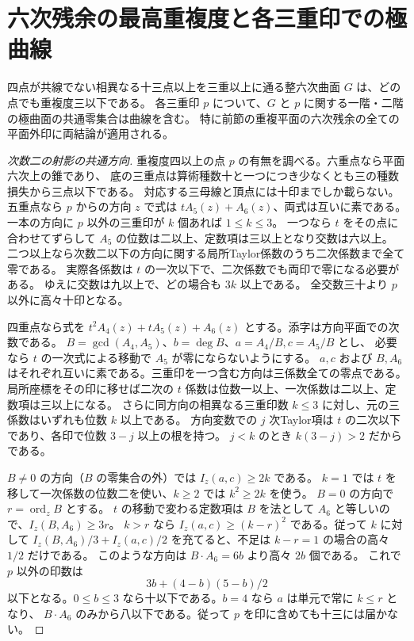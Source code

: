 \section{六次残余の最高重複度と各三重印での極曲線}
\label{sec:sextic-residual-triple-polars}
\begin{theorem}\label{thm:sextic-residual-triple-polars}
四点が共線でない相異なる十三点以上を三重以上に通る整六次曲面 $G$ は、どの点でも重複度三以下である。
各三重印 $p$ について、$G$ と $p$ に関する一階・二階の極曲面の共通零集合は曲線を含む。
特に前節の重複平面の六次残余の全ての平面外印に両結論が適用される。
\end{theorem}
\begin{proof}[次数二の射影の共通方向]
重複度四以上の点 $p$ の有無を調べる。六重点なら平面六次上の錐であり、
底の三重点は算術種数十と一つにつき少なくとも三の種数損失から三点以下である。
対応する三母線と頂点には十印までしか載らない。
五重点なら $p$ からの方向 $z$ で式は $tA_5(z)+A_6(z)$、両式は互いに素である。
一本の方向に $p$ 以外の三重印が $k$ 個あれば $1\le k\le3$。
一つなら $t$ をその点に合わせてずらして $A_5$ の位数は二以上、定数項は三以上となり交数は六以上。
二つ以上なら次数二以下の方向に関する局所Taylor係数のうち二次係数まで全て零である。
実際各係数は $t$ の一次以下で、二次係数でも両印で零になる必要がある。
ゆえに交数は九以上で、どの場合も $3k$ 以上である。
全交数三十より $p$ 以外に高々十印となる。

四重点なら式を $t^2 A_4(z)+t A_5(z)+A_6(z)$ とする。添字は方向平面での次数である。
$B=\gcd(A_4,A_5)$、$b=\deg B$、$a=A_4/B,c=A_5/B$ とし、
必要なら $t$ の一次式による移動で $A_5$ が零にならないようにする。
$a,c$ および $B,A_6$ はそれぞれ互いに素である。三重印を一つ含む方向は三係数全ての零点である。
局所座標をその印に移せば二次の $t$ 係数は位数一以上、一次係数は二以上、定数項は三以上になる。
さらに同方向の相異なる三重印数 $k\le3$ に対し、元の三係数はいずれも位数 $k$ 以上である。
方向変数での $j$ 次Taylor項は $t$ の二次以下であり、各印で位数 $3-j$ 以上の根を持つ。
$j<k$ のとき $k(3-j)>2$ だからである。

$B\ne0$ の方向（$B$ の零集合の外）では $I_z(a,c)\ge2k$ である。
$k=1$ では $t$ を移して一次係数の位数二を使い、$k\ge2$ では $k^2\ge2k$ を使う。
$B=0$ の方向で $r=\operatorname{ord}_z B$ とする。
$t$ の移動で変わる定数項は $B$ を法として $A_6$ と等しいので、$I_z(B,A_6)\ge3r$。
$k>r$ なら $I_z(a,c)\ge(k-r)^2$ である。従って $k$ に対して
$I_z(B,A_6)/3+I_z(a,c)/2$ を充てると、不足は $k-r=1$ の場合の高々 $1/2$ だけである。
このような方向は $B\cdot A_6=6b$ より高々 $2b$ 個である。
これで $p$ 以外の印数は
\[
                       3b+(4-b)(5-b)/2
\]
以下となる。$0\le b\le3$ なら十以下である。$b=4$ なら $a$ は単元で常に $k\le r$ となり、
$B\cdot A_6$ のみから八以下である。従って $p$ を印に含めても十三には届かない。
\end{proof}
